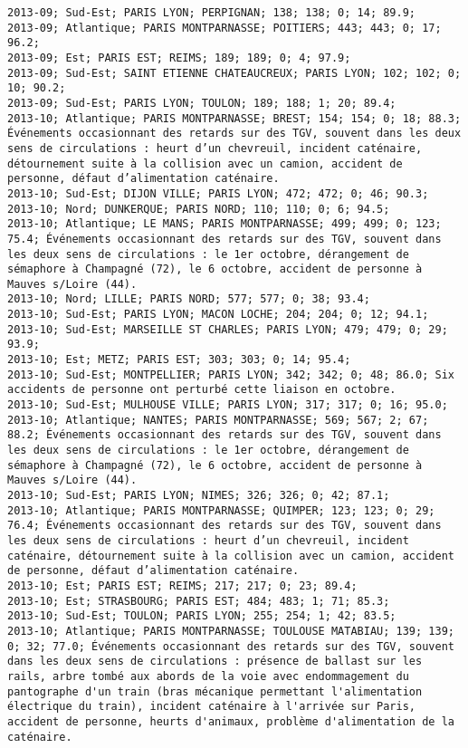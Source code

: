 \documentclass{article}
\begin{document}
\begin{Verbatim}[commandchars=\\\{\}]
2013-09; Sud-Est; PARIS LYON; PERPIGNAN; 138; 138; 0; 14; 89.9; 
2013-09; Atlantique; PARIS MONTPARNASSE; POITIERS; 443; 443; 0; 17; 96.2; 
2013-09; Est; PARIS EST; REIMS; 189; 189; 0; 4; 97.9; 
2013-09; Sud-Est; SAINT ETIENNE CHATEAUCREUX; PARIS LYON; 102; 102; 0; 10; 90.2; 
2013-09; Sud-Est; PARIS LYON; TOULON; 189; 188; 1; 20; 89.4; 
2013-10; Atlantique; PARIS MONTPARNASSE; BREST; 154; 154; 0; 18; 88.3; Événements occasionnant des retards sur des TGV, souvent dans les deux sens de circulations : heurt d’un chevreuil, incident caténaire, détournement suite à la collision avec un camion, accident de personne, défaut d’alimentation caténaire.
2013-10; Sud-Est; DIJON VILLE; PARIS LYON; 472; 472; 0; 46; 90.3; 
2013-10; Nord; DUNKERQUE; PARIS NORD; 110; 110; 0; 6; 94.5; 
2013-10; Atlantique; LE MANS; PARIS MONTPARNASSE; 499; 499; 0; 123; 75.4; Événements occasionnant des retards sur des TGV, souvent dans les deux sens de circulations : le 1er octobre, dérangement de sémaphore à Champagné (72), le 6 octobre, accident de personne à Mauves s/Loire (44).
2013-10; Nord; LILLE; PARIS NORD; 577; 577; 0; 38; 93.4; 
2013-10; Sud-Est; PARIS LYON; MACON LOCHE; 204; 204; 0; 12; 94.1; 
2013-10; Sud-Est; MARSEILLE ST CHARLES; PARIS LYON; 479; 479; 0; 29; 93.9; 
2013-10; Est; METZ; PARIS EST; 303; 303; 0; 14; 95.4; 
2013-10; Sud-Est; MONTPELLIER; PARIS LYON; 342; 342; 0; 48; 86.0; Six accidents de personne ont perturbé cette liaison en octobre.
2013-10; Sud-Est; MULHOUSE VILLE; PARIS LYON; 317; 317; 0; 16; 95.0; 
2013-10; Atlantique; NANTES; PARIS MONTPARNASSE; 569; 567; 2; 67; 88.2; Événements occasionnant des retards sur des TGV, souvent dans les deux sens de circulations : le 1er octobre, dérangement de sémaphore à Champagné (72), le 6 octobre, accident de personne à Mauves s/Loire (44).
2013-10; Sud-Est; PARIS LYON; NIMES; 326; 326; 0; 42; 87.1; 
2013-10; Atlantique; PARIS MONTPARNASSE; QUIMPER; 123; 123; 0; 29; 76.4; Événements occasionnant des retards sur des TGV, souvent dans les deux sens de circulations : heurt d’un chevreuil, incident caténaire, détournement suite à la collision avec un camion, accident de personne, défaut d’alimentation caténaire.
2013-10; Est; PARIS EST; REIMS; 217; 217; 0; 23; 89.4; 
2013-10; Est; STRASBOURG; PARIS EST; 484; 483; 1; 71; 85.3; 
2013-10; Sud-Est; TOULON; PARIS LYON; 255; 254; 1; 42; 83.5; 
2013-10; Atlantique; PARIS MONTPARNASSE; TOULOUSE MATABIAU; 139; 139; 0; 32; 77.0; Événements occasionnant des retards sur des TGV, souvent dans les deux sens de circulations : présence de ballast sur les rails, arbre tombé aux abords de la voie avec endommagement du pantographe d'un train (bras mécanique permettant l'alimentation électrique du train), incident caténaire à l'arrivée sur Paris, accident de personne, heurts d'animaux, problème d'alimentation de la caténaire.

\end{Verbatim}
\end{document}
